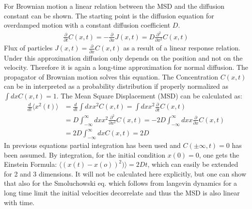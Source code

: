 \documentclass[
  a4paper,BCOR10mm,oneside,
  bibtotoc,idxtotoc,
  headsepline,footsepline,%
  fleqn,openbib
]{scrbook}
\begin{document}
For Brownian motion a linear relation between the MSD and the diffusion constant can be shown. The starting point is the diffusion equation for overdamped motion with a constant diffusion coefficient $D$. 
\begin{align}
 \frac{\partial}{\partial t} C(x,t) = - \frac{\partial }{\partial x} J (x,t) = D  \frac{\partial^2 }{\partial x^2} C(x,t) \label{eq:ficks}
\end{align}
Flux of particles  $J(x,t)=\frac{\partial }{\partial x} C(x,t)$ as a result of a linear response relation. 
Under this approximation diffusion only depends on the position and not on the velocity. Therefore it is again a long-time approximation for normal diffusion. The propagator of Brownian motion solves this equation. The Concentration $C(x,t)$ can be in interpreted as a probability distribution if properly normalized as $\int dx C(x,t)=1$. The Mean Square Displacement (MSD) can be calculated as:
\begin{align}
 \frac{d}{dt} \langle x^2(t)\rangle & =\frac{d}{dt} \int dx x^2 C(x,t)=\int dx x^2 \frac{\partial}{\partial t} C(x,t) \\
&= D \int_{-\infty}^{\infty}dx x^2 \frac{\partial^2 }{\partial x^2} C(x,t) = -2 D \int_{-\infty}^{\infty} dx x \frac{\partial }{\partial x} C(x,t) \\ &= 2 D \int_{-\infty}^{\infty} dx C(x,t) =2 D
\end{align}
In previous equations partial integration has been used and  $C(\pm \infty,t)=0$ has been assumed. By integration, for the initial condition $x(0) = 0$,  one gets the Einstein Formula: $\langle (x(t)-x(o))^2)\rangle= 2Dt$, which can easily be extended for 2 and 3 dimensions. It will not be calculated here explicitly, but one can show that also for the  Smoluchowski eq. which follows from langevin dynamics for a long time limit the initial velocities decorrelate and thus the MSD is also linear with time.
\end{document}

